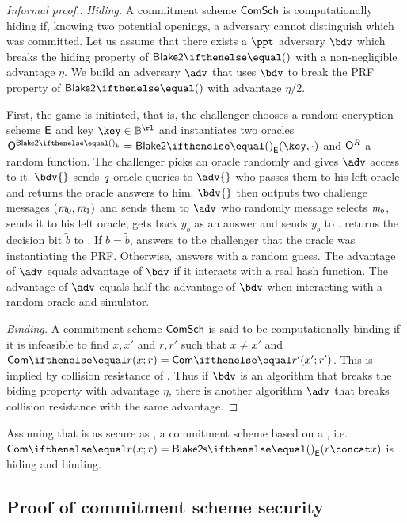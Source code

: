 \begin{proof}[Informal proof.]
\emph{Hiding.}
    A commitment scheme $\mathsf{ComSch}$ is computationally hiding if, knowing two potential openings, a \ppt{} adversary cannot distinguish which was committed. Let us assume that there exists a $\ppt$ adversary $\bdv$ which breaks the hiding property of $\blake{2}{}$ with a non-negligible advantage $\eta$. We build an adversary $\adv$ that uses $\bdv$ to break the PRF property of $\blake{2}{}$ with advantage $\eta/2$.

    First, the \prf{} game is initiated, that is, the challenger chooses a random encryption scheme $\mathsf{E}$ and key $\key \in \BB^\rl$ and instantiates two oracles $\oracle{\blake{2}{}_k} = \blake{2}{}_{\Enc}(\key, \cdot)$ and $\mathsf{O}^{R}$ a random function. The challenger picks an oracle randomly and gives $\adv$ access to it.
    $\bdv{}$ sends $\mathit{q}$ oracle queries to $\adv{}$ who passes them to his left oracle and returns the oracle answers to him. $\bdv{}$ then outputs two challenge messages $(\mathit{m}_0, \mathit{m}_1)$ and sends them to $\adv$ who randomly message selects $\mathit{m}_b$, sends it to his left oracle, gets back $y_b$ as an answer and sends $y_b$ to \bdv{}. \bdv{} returns the decision bit $\tilde{b}$ to \adv. If $b = \tilde{b}$, \adv{} answers to the challenger that the oracle was instantiating the PRF. Otherwise, \adv{} answers with a random guess.
    The advantage of $\adv$ equals advantage of $\bdv$ if it interacts with a real hash function. The advantage of $\adv$ equals half the advantage of $\bdv$ when interacting with a random oracle and simulator.

\emph{Binding.}
    A commitment scheme $\mathsf{ComSch}$ is said to be computationally binding if it is infeasible to find $x, x'$ and $r, r'$ such that $x \neq x'$ and $\commit{x}{r} = \commit{x'}{r'}$. This is implied by collision resistance of . Thus if $\bdv$ is an algorithm that breaks the biding property with advantage $\eta$, there is another algorithm $\adv$ that breaks  collision resistance with the same advantage.
\end{proof}

Assuming that  is as secure as , a commitment scheme based on a , i.e.~$\commit{x}{r} = \blake{2s}{}_{\Enc}(r \concat x)$ is hiding and binding.

\subsection{Proof of commitment scheme security}\label{appendix:blake:full-comm}

